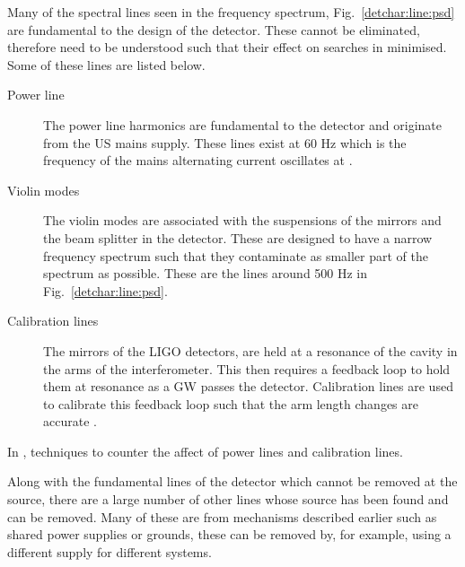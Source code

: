 Many of the spectral lines seen in the frequency spectrum, Fig.~\ref{detchar:line:psd} are fundamental to the design of the detector. 
These cannot be eliminated, therefore need to be understood such that their effect on searches in minimised.
Some of these lines are listed below.
\begin{description}
	\item[Power line] The power line harmonics are fundamental to the detector and originate from the US mains supply. These lines exist at 60 Hz which is the frequency of the mains alternating current oscillates at \citep{aasi2015CharacterizationLIGO}.
	
	\item[Violin modes] The violin modes are associated with the suspensions of the mirrors and the beam splitter in the detector. These are designed to have a narrow frequency spectrum such that they contaminate as smaller part of the spectrum as possible. These are the lines around 500 Hz in Fig.~\ref{detchar:line:psd}.
	
	\item[Calibration lines] The mirrors of the \ac{LIGO} detectors, are held at a resonance of the cavity in the arms of the interferometer. This then requires a feedback loop to hold them at resonance as a \ac{GW} passes the detector. Calibration lines are used to calibrate this feedback loop such that the arm length changes are accurate \citep{tuyenbayev2016ImprovingLIGO,coughlin2010NoiseLine}.
\end{description}
In \citep{davis2019ImprovingSensitivity}, techniques to counter the affect of power lines and calibration lines. 

Along with the fundamental lines of the detector which cannot be removed at the source, there are a large number of other lines whose source has been found and can be removed. 
Many of these are from mechanisms described earlier such as shared power supplies or grounds, these can be removed by, for example, using a different supply for different systems.

